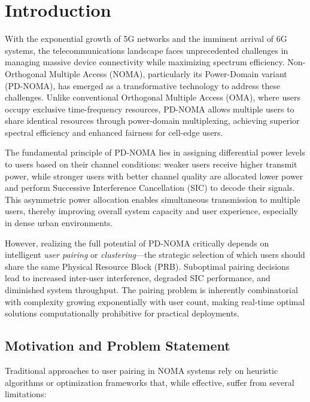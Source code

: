 \section{Introduction}

With the exponential growth of 5G networks and the imminent arrival of 6G systems, the telecommunications landscape faces unprecedented challenges in managing massive device connectivity while maximizing spectrum efficiency. Non-Orthogonal Multiple Access (NOMA), particularly its Power-Domain variant (PD-NOMA), has emerged as a transformative technology to address these challenges. Unlike conventional Orthogonal Multiple Access (OMA), where users occupy exclusive time-frequency resources, PD-NOMA allows multiple users to share identical resources through power-domain multiplexing, achieving superior spectral efficiency and enhanced fairness for cell-edge users.

The fundamental principle of PD-NOMA lies in assigning differential power levels to users based on their channel conditions: weaker users receive higher transmit power, while stronger users with better channel quality are allocated lower power and perform Successive Interference Cancellation (SIC) to decode their signals. This asymmetric power allocation enables simultaneous transmission to multiple users, thereby improving overall system capacity and user experience, especially in dense urban environments.

However, realizing the full potential of PD-NOMA critically depends on intelligent \emph{user pairing} or \emph{clustering}—the strategic selection of which users should share the same Physical Resource Block (PRB). Suboptimal pairing decisions lead to increased inter-user interference, degraded SIC performance, and diminished system throughput. The pairing problem is inherently combinatorial with complexity growing exponentially with user count, making real-time optimal solutions computationally prohibitive for practical deployments.

\subsection{Motivation and Problem Statement}

Traditional approaches to user pairing in NOMA systems rely on heuristic algorithms or optimization frameworks that, while effective, suffer from several limitations:

